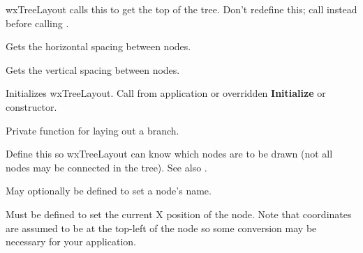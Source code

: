 

wxTreeLayout calls this to get the top of the tree. Don't redefine this; call
\rtfsp{} instead before calling .



Gets the horizontal spacing between nodes.



Gets the vertical spacing between nodes.



Initializes wxTreeLayout. Call from application or overridden {\bf Initialize}
or constructor.



Private function for laying out a branch.

\label{nodeactive}


Define this so wxTreeLayout can know which nodes are to be drawn (not all
nodes may be connected in the tree). See also .



May optionally be defined to set a node's name.



Must be defined to set the current X position of the node. Note that
coordinates are assumed to be at the top-left of the node so some conversion
may be necessary for your application.



